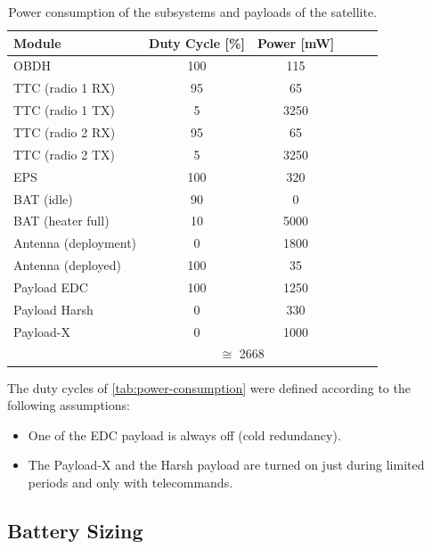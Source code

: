 \begin{table}[!h]
    \centering
    \begin{tabular}{lccccc}
        \toprule[1.5pt]
        \textbf{Module} & \textbf{Duty Cycle [\%]}    & \textbf{Power [mW]} \\
        \midrule
        OBDH                    & 100   & 115 \\
        TTC (radio 1 RX)        & 95    & 65 \\
        TTC (radio 1 TX)        & 5     & 3250 \\
        TTC (radio 2 RX)        & 95    & 65 \\
        TTC (radio 2 TX)        & 5     & 3250 \\
        EPS                     & 100   & 320 \\
        BAT (idle)              & 90    & 0 \\
        BAT (heater full)       & 10    & 5000 \\
        Antenna (deployment)    & 0     & 1800 \\
        Antenna (deployed)      & 100   & 35 \\
        Payload EDC             & 100   & 1250 \\
        Payload Harsh           & 0     & 330 \\
        Payload-X               & 0     & 1000 \\
        \cmidrule{2-3}
                                & \multicolumn{2}{c}{$\cong$ 2668} \\
        \bottomrule[1.5pt]
    \end{tabular}
    \caption{Power consumption of the subsystems and payloads of the satellite.}
    \label{tab:power-consumption}
\end{table}

The duty cycles of \autoref{tab:power-consumption} were defined according to the following assumptions:

\begin{itemize}
    \item One of the EDC payload is always off (cold redundancy).
    \item The Payload-X and the Harsh payload are turned on just during limited periods and only with telecommands.
\end{itemize}

\subsection{Battery Sizing}

